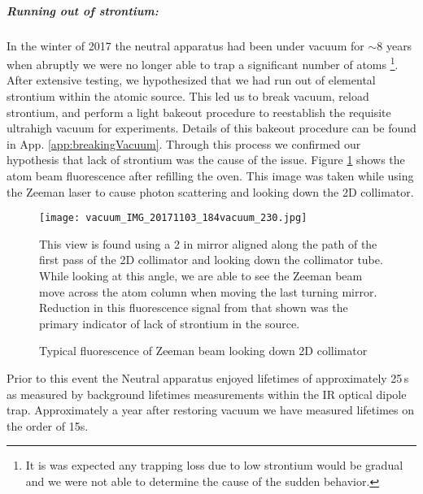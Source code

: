 \subparagraph{Running out of strontium:}
In the winter of 2017 the neutral apparatus had been under vacuum for $\sim$8 years when abruptly we were no longer able to trap a significant number of atoms \footnote{It is was expected any trapping loss due to low strontium would be gradual and we were not able to determine the cause of the sudden behavior.}.
After extensive testing, we hypothesized that we had run out of elemental strontium within the atomic source.
This led us to break vacuum, reload strontium, and perform a light bakeout procedure to reestablish the requisite ultrahigh vacuum for experiments.
Details of this bakeout procedure can be found in App. \ref{app:breakingVacuum}. 
Through this process we confirmed our hypothesis that lack of strontium was the cause of the issue. 
Figure \ref{fig:2d_coll_flourescence} shows the atom beam fluorescence after refilling the oven.
This image was taken while using the Zeeman laser to cause photon scattering and looking down the 2D collimator.
	\begin{figure}
		\centerline{
		\texttt{[image: vacuum\_IMG\_20171103\_184vacuum\_230.jpg]}}
		\caption{Typical fluorescence of Zeeman beam looking down 2D collimator}{This view is found using a 2 in mirror aligned along the path of the first pass of the 2D collimator and looking down the collimator tube. While looking at this angle, we are able to see the Zeeman beam move across the atom column when moving the last turning mirror. Reduction in this fluorescence signal from that shown was the primary indicator of lack of strontium in the source.}
		\label{fig:2d_coll_flourescence}
	\end{figure}  
Prior to this event the Neutral apparatus enjoyed lifetimes of approximately 25\,s as measured by background lifetimes measurements within the IR optical dipole trap. 
Approximately a year after restoring vacuum we have measured lifetimes on the order of 15s.

